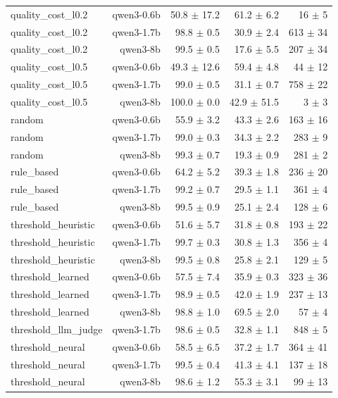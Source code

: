 \begin{table}[t]
\begin{tabular}{lrrrr}
quality\_cost\_l0.2 & qwen3-0.6b & 50.8 $\pm$ 17.2 & 61.2 $\pm$ 6.2 & 16 $\pm$ 5 \\
quality\_cost\_l0.2 & qwen3-1.7b & 98.8 $\pm$ 0.5 & 30.9 $\pm$ 2.4 & 613 $\pm$ 34 \\
quality\_cost\_l0.2 & qwen3-8b & 99.5 $\pm$ 0.5 & 17.6 $\pm$ 5.5 & 207 $\pm$ 34 \\
quality\_cost\_l0.5 & qwen3-0.6b & 49.3 $\pm$ 12.6 & 59.4 $\pm$ 4.8 & 44 $\pm$ 12 \\
quality\_cost\_l0.5 & qwen3-1.7b & 99.0 $\pm$ 0.5 & 31.1 $\pm$ 0.7 & 758 $\pm$ 22 \\
quality\_cost\_l0.5 & qwen3-8b & 100.0 $\pm$ 0.0 & 42.9 $\pm$ 51.5 & 3 $\pm$ 3 \\
random & qwen3-0.6b & 55.9 $\pm$ 3.2 & 43.3 $\pm$ 2.6 & 163 $\pm$ 16 \\
random & qwen3-1.7b & 99.0 $\pm$ 0.3 & 34.3 $\pm$ 2.2 & 283 $\pm$ 9 \\
random & qwen3-8b & 99.3 $\pm$ 0.7 & 19.3 $\pm$ 0.9 & 281 $\pm$ 2 \\
rule\_based & qwen3-0.6b & 64.2 $\pm$ 5.2 & 39.3 $\pm$ 1.8 & 236 $\pm$ 20 \\
rule\_based & qwen3-1.7b & 99.2 $\pm$ 0.7 & 29.5 $\pm$ 1.1 & 361 $\pm$ 4 \\
rule\_based & qwen3-8b & 99.5 $\pm$ 0.9 & 25.1 $\pm$ 2.4 & 128 $\pm$ 6 \\
threshold\_heuristic & qwen3-0.6b & 51.6 $\pm$ 5.7 & 31.8 $\pm$ 0.8 & 193 $\pm$ 22 \\
threshold\_heuristic & qwen3-1.7b & 99.7 $\pm$ 0.3 & 30.8 $\pm$ 1.3 & 356 $\pm$ 4 \\
threshold\_heuristic & qwen3-8b & 99.5 $\pm$ 0.8 & 25.8 $\pm$ 2.1 & 129 $\pm$ 5 \\
threshold\_learned & qwen3-0.6b & 57.5 $\pm$ 7.4 & 35.9 $\pm$ 0.3 & 323 $\pm$ 36 \\
threshold\_learned & qwen3-1.7b & 98.9 $\pm$ 0.5 & 42.0 $\pm$ 1.9 & 237 $\pm$ 13 \\
threshold\_learned & qwen3-8b & 98.8 $\pm$ 1.0 & 69.5 $\pm$ 2.0 & 57 $\pm$ 4 \\
threshold\_llm\_judge & qwen3-1.7b & 98.6 $\pm$ 0.5 & 32.8 $\pm$ 1.1 & 848 $\pm$ 5 \\
threshold\_neural & qwen3-0.6b & 58.5 $\pm$ 6.5 & 37.2 $\pm$ 1.7 & 364 $\pm$ 41 \\
threshold\_neural & qwen3-1.7b & 99.5 $\pm$ 0.4 & 41.3 $\pm$ 4.1 & 137 $\pm$ 18 \\
threshold\_neural & qwen3-8b & 98.6 $\pm$ 1.2 & 55.3 $\pm$ 3.1 & 99 $\pm$ 13 \\
\bottomrule
\end{tabular}
\end{table}

